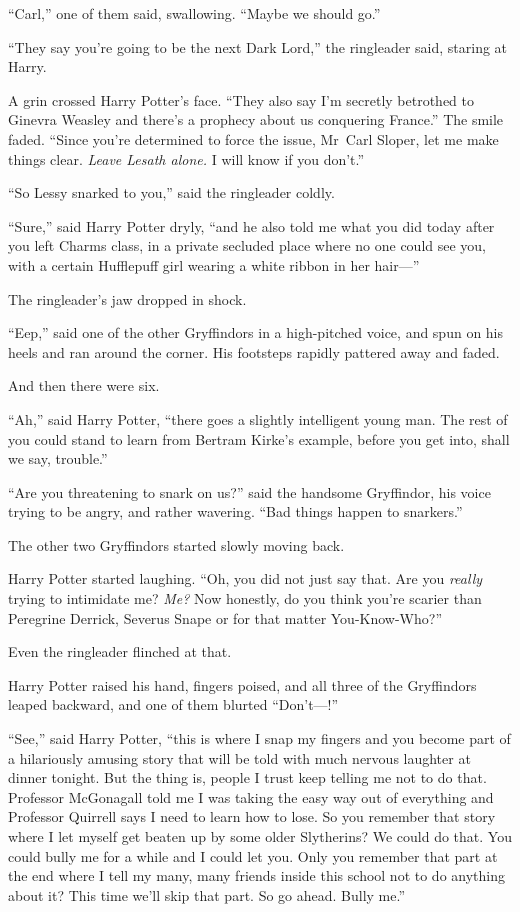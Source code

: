 “Carl,” one of them said, swallowing. “Maybe we should go.”

“They say you’re going to be the next Dark Lord,” the ringleader said, staring
at Harry.

A grin crossed Harry Potter’s face. “They also say I’m secretly betrothed to
Ginevra Weasley and there’s a prophecy about us conquering France.” The smile
faded. “Since you’re determined to force the issue, Mr~Carl Sloper, let me
make things clear. \emph{Leave Lesath alone.} I will know if you don’t.”

“So Lessy snarked to you,” said the ringleader coldly.

“Sure,” said Harry Potter dryly, “and he also told me what you did today after
you left Charms class, in a private secluded place where no one could see you,
with a certain Hufflepuff girl wearing a white ribbon in her hair—”

The ringleader’s jaw dropped in shock.

“Eep,” said one of the other Gryffindors in a high-pitched voice, and spun on
his heels and ran around the corner. His footsteps rapidly pattered away and
faded.

And then there were six.

“Ah,” said Harry Potter, “there goes a slightly intelligent young man. The rest
of you could stand to learn from Bertram Kirke’s example, before you get into,
shall we say, trouble.”

“Are you threatening to snark on us?” said the handsome Gryffindor, his voice
trying to be angry, and rather wavering. “Bad things happen to snarkers.”

The other two Gryffindors started slowly moving back.

Harry Potter started laughing. “Oh, you did not just say that. Are you
\emph{really} trying to intimidate me? \emph{Me?} Now honestly, do you think
you’re scarier than Peregrine Derrick, Severus Snape or for that matter
You-Know-Who?”

Even the ringleader flinched at that.

Harry Potter raised his hand, fingers poised, and all three of the Gryffindors
leaped backward, and one of them blurted “Don’t—!”

“See,” said Harry Potter, “this is where I snap my fingers and you become part
of a hilariously amusing story that will be told with much nervous laughter at
dinner tonight. But the thing is, people I trust keep telling me not to do
that. Professor McGonagall told me I was taking the easy way out of everything
and Professor Quirrell says I need to learn how to lose. So you remember that
story where I let myself get beaten up by some older Slytherins? We could do
that. You could bully me for a while and I could let you. Only you remember
that part at the end where I tell my many, many friends inside this school not
to do anything about it? This time we’ll skip that part. So go ahead. Bully me.”

